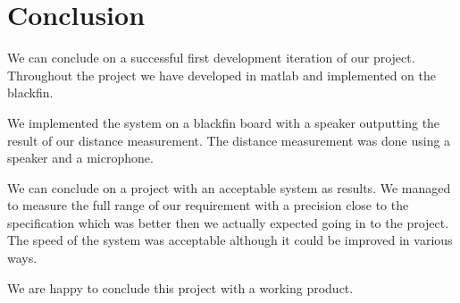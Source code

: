 \chapter{Conclusion}
We can conclude on a successful first development iteration of our project. Throughout the project we have developed in matlab and implemented on the blackfin.

We implemented the system on a blackfin board with a speaker outputting the result of our distance measurement. The distance measurement was done using a speaker and a microphone.

We can conclude on a project with an acceptable system as results. We managed to measure the full range of our requirement with a precision close to the specification which was better then we actually expected going in to the project. The speed of the system was acceptable although it could be improved in various ways. 

We are happy to conclude this project with a working product.